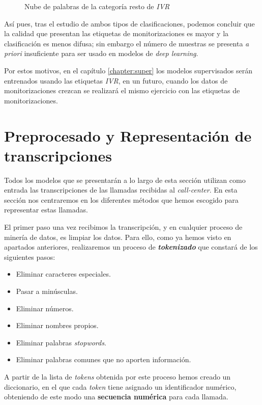 \FloatBarrier
\begin{figure}[!ht]
	\centering
    \caption{Nube de palabras de la categoría resto de \textit{IVR}}
    \label{fig:cloudivr_resto}
\end{figure} 


Así pues, tras el estudio de ambos tipos de clasificaciones, podemos concluir que la calidad que presentan las etiquetas de monitorizaciones es mayor y la clasificación es menos difusa; sin embargo el número de muestras se presenta \textit{a priori} insuficiente para ser usado en modelos de \textit{deep learning}. 

Por estos motivos, en el capítulo \ref{chapter:super} los modelos supervisados serán entrenados usando las etiquetas \textit{IVR}, en un futuro, cuando los datos de monitorizaciones crezcan se realizará el mismo ejercicio con las etiquetas de monitorizaciones. 


\section{Preprocesado y Representación de transcripciones}
\label{section:data:repr}



Todos los modelos que se presentarán a lo largo de esta sección utilizan como entrada las transcripciones de las llamadas recibidas al \textit{call-center}. En esta sección nos centraremos en los diferentes métodos que hemos escogido para representar estas llamadas.


El primer paso una vez recibimos la transcripción, y en cualquier proceso de minería de datos, es limpiar los datos. Para ello, como ya hemos visto en apartados anteriores, realizaremos un proceso de \textit{\textbf{tokenizado}} que constará de los siguientes pasos: 

\begin{itemize}
\item Eliminar caracteres especiales. 
\item Pasar a minúsculas. 
\item Eliminar números. 
\item Eliminar nombres propios. 
\item Eliminar palabras \textit{stopwords}. 
\item Eliminar palabras comunes que no aporten información.
\end{itemize}

A partir de la lista de \textit{tokens} obtenida por este proceso hemos creado un diccionario, en el que cada \textit{token} tiene asignado un identificador numérico, obteniendo de este modo una \textbf{secuencia numérica} para cada llamada. 

